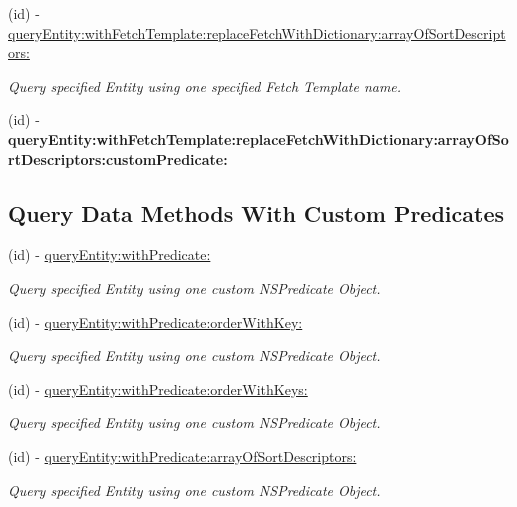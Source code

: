 \begin{DoxyCompactItemize}
(id) -\/ \hyperlink{interface_j_p_d_b_manager_action_ad9f87e94c40f183732a44fd181ec96f6}{queryEntity:withFetchTemplate:replaceFetchWithDictionary:arrayOfSortDescriptors:}
\begin{DoxyCompactList}\small\item\em Query specified Entity using one specified Fetch Template name. \item\end{DoxyCompactList}\item 
\hypertarget{interface_j_p_d_b_manager_action_a22a107d745d907acf845ab0e2528f18e}{
(id) -\/ {\bfseries queryEntity:withFetchTemplate:replaceFetchWithDictionary:arrayOfSortDescriptors:customPredicate:}}
\label{interface_j_p_d_b_manager_action_a22a107d745d907acf845ab0e2528f18e}

\end{DoxyCompactItemize}
\subsection*{Query Data Methods With Custom Predicates}
\begin{DoxyCompactItemize}
\item 
(id) -\/ \hyperlink{interface_j_p_d_b_manager_action_a0b4bbc0a957856f7e0166d58f987e8dc}{queryEntity:withPredicate:}
\begin{DoxyCompactList}\small\item\em Query specified Entity using one custom NSPredicate Object. \item\end{DoxyCompactList}\item 
(id) -\/ \hyperlink{interface_j_p_d_b_manager_action_a59b25a33e515e04dbf7e7d83855e86d1}{queryEntity:withPredicate:orderWithKey:}
\begin{DoxyCompactList}\small\item\em Query specified Entity using one custom NSPredicate Object. \item\end{DoxyCompactList}\item 
(id) -\/ \hyperlink{interface_j_p_d_b_manager_action_a8b9de476586b7352658c07c6f9b92bd9}{queryEntity:withPredicate:orderWithKeys:}
\begin{DoxyCompactList}\small\item\em Query specified Entity using one custom NSPredicate Object. \item\end{DoxyCompactList}\item 
(id) -\/ \hyperlink{interface_j_p_d_b_manager_action_aa7020d4c7938f259bab678b4c9b0a056}{queryEntity:withPredicate:arrayOfSortDescriptors:}
\begin{DoxyCompactList}\small\item\em Query specified Entity using one custom NSPredicate Object. \item\end{DoxyCompactList}\end{DoxyCompactItemize}
